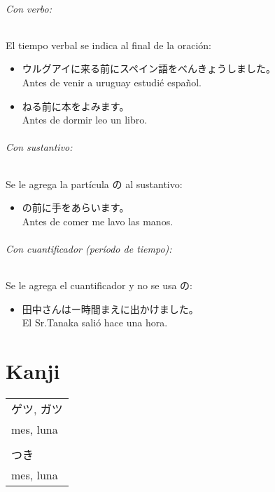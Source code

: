 \documentclass[a4paper,12pt,oneside]{report}
\begin{document}
\begin{CJK*}{UTF8}{min}
        \subparagraph{Con verbo:}

        El tiempo verbal se indica al final de la oraci\'on:

        \begin{itemize}
          \item ウルグアイに来る前にスペイン語をべんきょうしました。\\
                Antes de venir a uruguay estudi\'e español.
          \item ねる前に本をよみます。\\
                Antes de dormir leo un libro.
        \end{itemize}

        \subparagraph{Con sustantivo:}

        Se le agrega la part\'icula の al sustantivo:

        \begin{itemize}
          \item {}の前に手をあらいます。\\
                Antes de comer me lavo las manos.
        \end{itemize}

        \subparagraph{Con cuantificador (per\'iodo de tiempo):}

        Se le agrega el cuantificador y no se usa の:

        \begin{itemize}
          \item 田中さんはー時間まえに出かけました。\\
                El Sr.Tanaka sali\'o hace una hora.
        \end{itemize}


\chapter{Kanji}
  \thispagestyle{contenido} %
  \pagestyle{contenido}     %

  \begin{minipage}{1.2in}
  \end{minipage}
  \begin{minipage}{3in}
    \begin{tabular}{l}
      ゲツ, ガツ \\
      mes, luna \\
      \\
      つき \\
      mes, luna
    \end{tabular}
  \end{minipage}


\end{CJK*}
\end{document}
